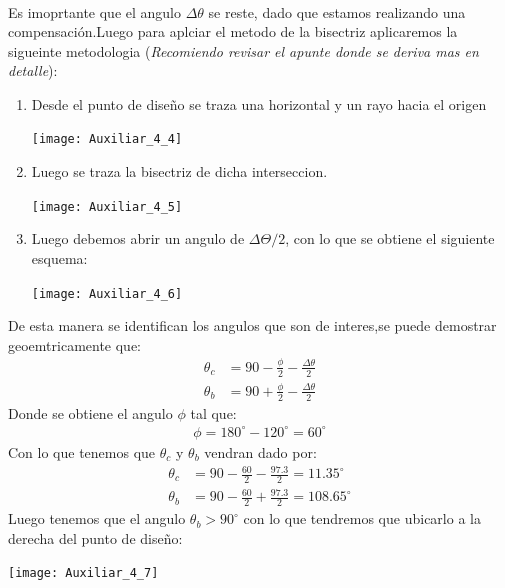 \documentclass[
  11pt,
  letterpaper,
   addpoints,
   answers
  ]{exam}
\begin{document}
\begin{questions}
\begin{solution}
\begin{align}
\end{align}
Es imoprtante que el angulo $\Delta\theta$ se reste, dado que estamos realizando una compensación.Luego para aplciar el metodo de la bisectriz aplicaremos la sigueinte metodologia (\textit{Recomiendo revisar el apunte donde se deriva mas en detalle}):
\begin{enumerate}
    \item Desde el punto de diseño se traza una horizontal y un rayo hacia el origen
    \begin{center}
        \texttt{[image: Auxiliar\_4\_4]}
    \end{center}
    \item Luego se traza la bisectriz de dicha interseccion.
    \begin{center}
        \texttt{[image: Auxiliar\_4\_5]}
    \end{center}
    \item Luego debemos abrir un angulo de $\Delta\Theta/2$, con lo que se obtiene el siguiente esquema:
    \begin{center}
        \texttt{[image: Auxiliar\_4\_6]}
    \end{center}
\end{enumerate}
De esta manera se identifican los angulos que son de interes,se puede demostrar geoemtricamente que:
\begin{align}
    \theta_{c} &= 90 - \frac{\phi}{2} - \frac{\Delta \theta}{2}\\ 
    \theta_{b} &= 90 + \frac{\phi}{2} - \frac{\Delta \theta}{2}
\end{align}
Donde se obtiene el angulo $\phi$ tal que:
\begin{align}
    \phi = 180^{\circ} - 120^{\circ} = 60^{\circ}
\end{align}
Con lo que tenemos que $\theta_{c}$ y $\theta_{b}$ vendran dado por:
\begin{align}
    \theta_{c} &= 90 - \frac{60}{2} - \frac{97.3}{2} = 11.35^{\circ}\\
    \theta_{b} &= 90 - \frac{60}{2} + \frac{97.3}{2} = 108.65^{\circ}
\end{align}
Luego tenemos que el angulo $\theta_{b}>90^{\circ}$ con lo que tendremos que ubicarlo a la derecha del punto de diseño:
\begin{center}
    \texttt{[image: Auxiliar\_4\_7]}
\end{center}

\end{solution}
\end{questions}
\end{document}
